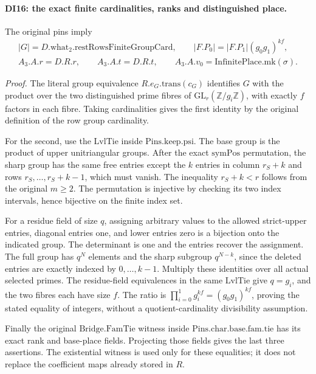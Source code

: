 \paragraph{DI16: the exact finite cardinalities, ranks and distinguished place.}
\label{claim:DI16}
The original pins imply
\[
\begin{gathered}
 |G|=D.\mathrm{what}_2.\mathrm{restRowsFiniteGroupCard},\qquad
 |F.P_0|=|F.P_1|(g_0g_1)^{kf},\\
 A_3.A.r=D.R.r,\qquad A_3.A.t=D.R.t,\qquad
 A_3.A.v_0=\mathrm{InfinitePlace.mk}(\sigma).
\end{gathered}
 \tag{DI.40}
\]

\emph{Proof.}
The literal group equivalence \(R.e_G.\mathrm{trans}(c_G)\)
identifies \(G\) with the product over the two distinguished prime
fibres of \(\mathrm{GL}_r(\mathbb Z/g_i\mathbb Z)\), with exactly
\(f\) factors in each fibre. Taking cardinalities gives the first
identity by the original definition of the row group cardinality.

For the second, use the \(\mathrm{LvlTie}\) inside
\(\mathrm{Pins}.\mathrm{keep}.\mathrm{psi}\). The base group is
the product of upper unitriangular groups. After the exact
\(\mathrm{symPos}\) permutation, the sharp group has the same
free entries except the \(k\) entries in column \(r_S+k\) and
rows \(r_S,\ldots,r_S+k-1\), which must vanish. The inequality
\(r_S+k<r\) follows from the original \(m\ge2\).
The permutation is injective by checking its two index intervals,
hence bijective on the finite index set.

For a residue field of size \(q\), assigning arbitrary values to
the allowed strict-upper entries, diagonal entries one, and lower
entries zero is a bijection onto the indicated group. The determinant
is one and the entries recover the assignment. The full group has
\(q^N\) elements and the sharp subgroup \(q^{N-k}\), since the
deleted entries are exactly indexed by \(0,\ldots,k-1\).
Multiply these identities over all actual selected primes. The
residue-field equivalences in the same \(\mathrm{LvlTie}\) give
\(q=g_i\), and the two fibres each have size \(f\). The ratio
is \(\prod_{i=0}^1 g_i^{kf}=(g_0g_1)^{kf}\), proving the stated
equality of integers, without a quotient-cardinality divisibility
assumption.

Finally the original \(\mathrm{Bridge.FamTie}\) witness inside
\(\mathrm{Pins}.\mathrm{char}.\mathrm{base}.\mathrm{fam}.\mathrm{tie}\)
has its exact rank and base-place fields. Projecting those fields
gives the last three assertions. The existential witness is used
only for these equalities; it does not replace the coefficient maps
already stored in \(R\).

